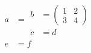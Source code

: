 \begin{align}
  a & = \begin{aligned}
          b & = \begin{pmatrix}
                  1 & 2 \\
                  3 & 4
                \end{pmatrix} \\
          c & = d
        \end{aligned} \\
  e & = f
\end{align}
